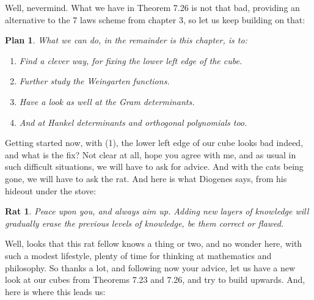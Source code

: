 \documentclass[12pt]{amsbook}
\newtheorem{plan}[theorem]{Plan}
\newtheorem{rat}[theorem]{Rat}
\begin{document}
\bigskip

Well, nevermind. What we have in Theorem 7.26 is not that bad, providing an alternative to the 7 laws scheme from chapter 3, so let us keep building on that:

\begin{plan}
What we can do, in the remainder is this chapter, is to:
\begin{enumerate}
\item Find a clever way, for fixing the lower left edge of the cube.

\item Further study the Weingarten functions.

\item Have a look as well at the Gram determinants.

\item And at Hankel determinants and orthogonal polynomials too. 
\end{enumerate}
\end{plan}

Getting started now, with (1), the lower left edge of our cube looks bad indeed, and what is the fix? Not clear at all, hope you agree with me, and as usual in such difficult situations, we will have to ask for advice. And with the cats being gone, we will have to ask the rat. And here is what Diogenes says, from his hideout under the stove:

\begin{rat}
Peace upon you, and always aim up. Adding new layers of knowledge will gradually erase the previous levels of knowledge, be them correct or flawed.
\end{rat}

Well, looks that this rat fellow knows a thing or two, and no wonder here, with such a modest lifestyle, plenty of time for thinking at mathematics and philosophy. So thanks a lot, and following now your advice, let us have a new look at our cubes from Theorems 7.23 and 7.26, and try to build upwards. And, here is where this leads us:
\end{document}

